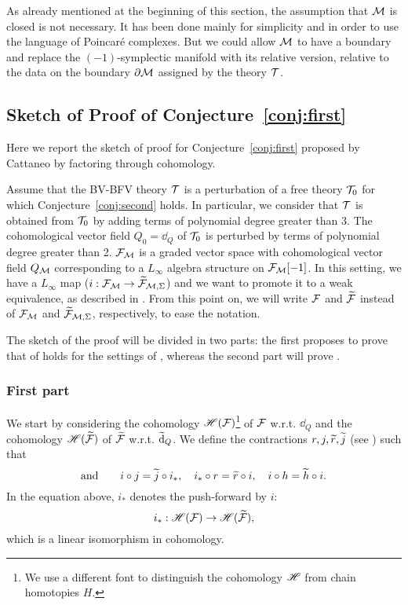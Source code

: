 As already mentioned at the beginning of this section, the assumption that $\mathcal{M}$ is closed is not necessary.
It has been done mainly for simplicity and in order to use the language of Poincaré complexes.
But we could allow $\mathcal{M}$ to have a boundary and replace the $(-1)$-symplectic manifold with its relative version, relative to the data on the boundary $\partial \mathcal{M}$ assigned by the theory $\mathcal{T}$.

\subsection{Sketch of Proof of Conjecture~\ref{conj:first}}
\label{subsec:sketch_proof}

Here we report the sketch of proof for Conjecture~\ref{conj:first} proposed by Cattaneo \etal by factoring through cohomology.

Assume that the BV-BFV theory $\mathcal{T}$ is a perturbation of a free theory $\mathcal{T}_0$ for which Conjecture~\ref{conj:second} holds.
In particular, we consider that $\mathcal{T}$ is obtained from $\mathcal{T}_0$ by adding terms of polynomial degree greater than 3.
The cohomological vector field $Q_0 = \dd_Q$ of $\mathcal{T}_0$ is perturbed by terms of polynomial degree greater than 2.
$\mathcal{F}_{\mathcal{M}}$ is a graded vector space with cohomological vector field $Q_{\mathcal{M}}$ corresponding to a $L_\infty$ algebra structure on $\mathcal{F}_{\mathcal{M}}[-1]$.
In this setting, we have a $L_\infty$ map ($i:\mathcal{F}_{\mathcal{M}} \rightarrow \widetilde{\mathcal{F}}_{\mathcal{M}, \Sigma}$) and we want to promote it to a weak equivalence, as described in .
From this point on, we will write $\mathcal{F}$ and $\widetilde{\mathcal{F}}$ instead of $\mathcal{F}_{\mathcal{M}}$ and $\widetilde{\mathcal{F}}_{\mathcal{M}, \Sigma}$, respectively, to ease the notation.

The sketch of the proof will be divided in two parts: the first proposes to prove that  of  holds for the settings of , whereas the second part will prove .

\subsubsection{First part}
\label{subsubsec:first_part}

We start by considering the cohomology $\mathscr{H}(\mathcal{F})$\footnote{We use a different font to distinguish the cohomology $\mathscr{H}$ from chain homotopies $H$.}
of $\mathcal{F}$ w.r.t. $\dd_Q$ and the cohomology $\mathscr{H}(\widetilde{\mathcal{F}})$ of $\widetilde{\mathcal{F}}$ w.r.t. $\widetilde{\dd}_Q$.
We define the contractions $r, j, \widetilde{r}, \widetilde{j}$ (see ) such that
\begin{equation}
    
\end{equation}
\begin{equation}
\label{eq:contractions}
    \text{and} \qquad
    i \circ j = \widetilde{j} \circ i_*, \quad
    i_* \circ r = \widetilde{r} \circ i, \quad
    i \circ h = \widetilde{h} \circ i .
\end{equation}
In the equation above, $i_*$ denotes the push-forward by $i$:
\begin{equation*}
    i_* : \mathscr{H}(\mathcal{F}) \rightarrow \mathscr{H}(\widetilde{\mathcal{F}}) ,
\end{equation*}
which is a linear isomorphism in cohomology.

